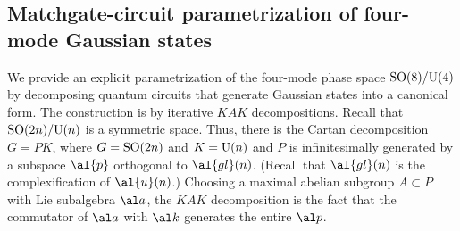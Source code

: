 
\subsection{Matchgate-circuit parametrization of four-mode Gaussian states}


We provide an explicit parametrization of the four-mode phase space $\text{SO}(8)/ \text{U}(4)$ by decomposing quantum circuits that generate Gaussian states into a canonical form. The construction is by iterative $KAK$ decompositions. Recall that $\text{SO}(2n)/\text{U}(n)$ is a symmetric space. Thus, there is the Cartan decomposition $G=PK$, where $G=\text{SO}(2n)$ and $K=\text{U}(n)$ and $P$ is infinitesimally generated by a subspace $\al{p}$ orthogonal to $\al{gl}(n)$. (Recall that $\al{gl}(n)$ is the complexification of $\al{u}(n)$.) Choosing a maximal abelian subgroup $A \subset P$ with Lie subalgebra $\al a$, the $KAK$ decomposition is the fact that the commutator of $\al a$ with $\al k$ generates the entire $\al p$.



